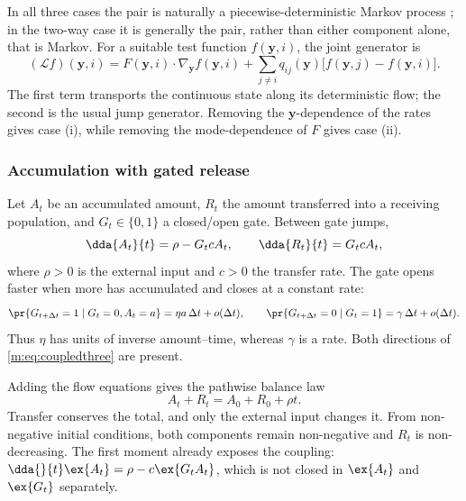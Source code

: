 In all three cases the pair is naturally a piecewise-deterministic Markov
process \cite{Davis1993}; in the two-way case it is generally the pair, rather
than either component alone, that is Markov. For a suitable test function
$f(\mathbf y,i)$, the joint generator is
\begin{equation}
\label{m:eq:coupledgenerator}
(\mathcal Lf)(\mathbf y,i)
=F(\mathbf y,i)\mathbin{\cdot}\nabla_{\mathbf y}f(\mathbf y,i)
+\sum_{j\ne i}q_{ij}(\mathbf y)
  \bigl[f(\mathbf y,j)-f(\mathbf y,i)\bigr].
\end{equation}
The first term transports the continuous state along its deterministic flow;
the second is the usual jump generator. Removing the $\mathbf y$-dependence
of the rates gives case (i), while removing the mode-dependence of $F$ gives
case (ii).

\subsubsection{Accumulation with gated release}
\label{m:sec:gated}

Let $A_t$ be an accumulated amount, $R_t$ the amount transferred into a
receiving population, and $G_t\in\{0,1\}$ a closed/open gate. Between gate
jumps,
\begin{equation}
\label{m:eq:gatedflow}
\dda{A_t}{t}=\rho-G_tcA_t,
\qquad
\dda{R_t}{t}=G_tcA_t,
\end{equation}
where $\rho>0$ is the external input and $c>0$ the transfer rate. The gate
opens faster when more has accumulated and closes at a constant rate:
\begin{equation}
\label{m:eq:gatedjumps}
\pr{G_{t+\Delta t}=1\mid G_t=0,A_t=a}
=\eta a\,\Delta t+o(\Delta t),
\qquad
\pr{G_{t+\Delta t}=0\mid G_t=1}
=\gamma\,\Delta t+o(\Delta t).
\end{equation}
Thus $\eta$ has units of inverse amount--time, whereas $\gamma$ is a rate.
Both directions of \cref{m:eq:coupledthree} are present.

Adding the flow equations gives the pathwise balance law
\begin{equation}
\label{m:eq:gatedbalance}
A_t+R_t=A_0+R_0+\rho t.
\end{equation}
Transfer conserves the total, and only the external input changes it. From
non-negative initial conditions, both components remain non-negative and
$R_t$ is non-decreasing. The first moment already exposes the coupling:
$\dda{}{t}\ex{A_t}=\rho-c\ex{G_tA_t}$, which is not closed in
$\ex{A_t}$ and $\ex{G_t}$ separately.

